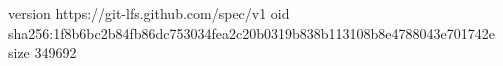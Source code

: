 version https://git-lfs.github.com/spec/v1
oid sha256:1f8b6bc2b84fb86dc753034fea2c20b0319b838b113108b8e4788043e701742e
size 349692
